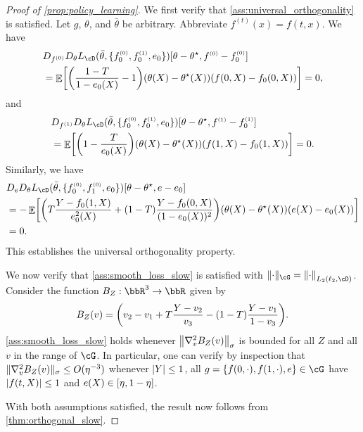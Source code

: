 \documentclass[11pt]{article} %
\newcommand{\pref}[1]{\cref{#1}}
\newcommand{\pfref}[1]{Proof of \pref{#1}}
\theoremstyle{theorem}  %
\theoremstyle{plain}
\DeclarePairedDelimiter{\abs}{\lvert}{\rvert} %
\DeclarePairedDelimiter{\brk}{[}{]}
\DeclarePairedDelimiter{\crl}{\{}{\}}
\DeclarePairedDelimiter{\prn}{(}{)}
\DeclarePairedDelimiter{\nrm}{\|}{\|}
\DeclareMathOperator{\En}{\mathbb{E}}
\newcommand{\ls}{\ell}
\newcommand{\grad}{\nabla}
\newcommand{\thetabar}{\bar{\theta}}
\newcommand{\bigoh}{O}
\newcommand{\poprisk}{L_{\cD}}
\newcommand{\besttwo}{\theta^{\star}}
\newcommand{\ind}[1]{^{\scriptscriptstyle (#1)}}
\begin{document}
  \begin{proof}[\pfref{prop:policy_learning}]
    We first verify that \pref{ass:universal_orthogonality} is satisfied. Let $g$, $\theta$, and $\bar{\theta}$ be arbitrary. Abbreviate $f\ind{t}(x)=f(t,x)$. We have
    \begin{align*}
      &D_{f\ind{0}}D_{\theta}\poprisk(\thetabar,\crl{f_0\ind{0},f_0\ind{1},e_0})[\theta-\besttwo,f\ind{0}-f\ind{0}_0]\\
      &= \En\brk*{
      \prn*{\frac{1-T}{1-e_0(X)} -1}
      (\theta(X)-\besttwo(X))(f(0,X)-f_0(0,X))
        }= 0,
        \end{align*}
        and
        \begin{align*}
    &    D_{f\ind{1}}D_{\theta}\poprisk(\thetabar,\crl{f_0\ind{0},f_0\ind{1},e_0})[\theta-\besttwo,f\ind{1}-f\ind{1}_0] \\
            &=\En\brk*{
      \prn*{1 - \frac{T}{e_0(X)}}
      (\theta(X)-\besttwo(X))(f(1,X)-f_0(1,X))
              } =0.
    \end{align*}
    Similarly, we have
        \begin{align*}
      &D_eD_{\theta}\poprisk(\thetabar,\crl{f_0\ind{0},f_1\ind{0},e_0})[\theta-\besttwo,e-e_0]\\
      &= -\En\brk*{
      \prn*{T\frac{Y-f_0(1,X)}{e_0^2(X)} + (1-T)\frac{Y-f_0(0,X)}{(1-e_0(X))^2}}
      (\theta(X)-\besttwo(X))(e(X)-e_0(X))
        }\\
      &=0.
        \end{align*}
        This establishes the universal orthogonality property.

        We now verify that \pref{ass:smooth_loss_slow} is satisfied with $\nrm{\cdot}_{\cG}=\nrm*{\cdot}_{L_2(\ls_2,\cD)}$. Consider the function $B_Z:\bbR^{3}\to\bbR$ given by
        \[
          B_Z(v) = \prn*{v_2 -v_1 + T\frac{Y-v_2}{v_3} - (1-T)\frac{Y-v_1}{1-v_3}}.
        \]
        \pref{ass:smooth_loss_slow} holds whenever $\nrm*{\grad^{2}_v{}B_Z(v)}_{\sigma}$ is bounded for all $Z$ and all $v$ in the range of $\cG$. In particular, one can verify by inspection that $\nrm{\grad^{2}_v{}B_Z(v)}_{\sigma}\leq{}\bigoh(\eta^{-3})$ whenever $\abs{Y}\leq{}1$, all $g=\crl{f(0,\cdot),f(1,\cdot),e}\in\cG$ have $\abs{f(t,X)}\leq{}1$ and $e(X)\in\brk{\eta,1-\eta}$.

With both assumptions satisfied, the result now follows from \pref{thm:orthogonal_slow}.
  \end{proof}


%
%
%
%
 
\end{document}
